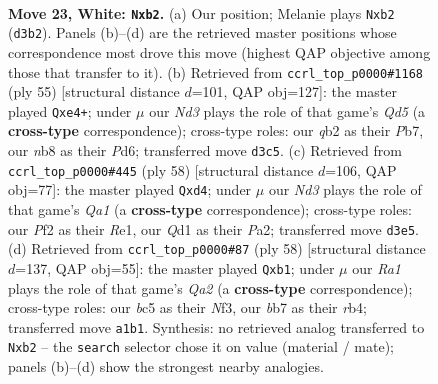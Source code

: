 \documentclass[11pt]{article}
\begin{document}
\clearpage

\begin{figure}[p]\centering
\begin{subfigure}{0.46\textwidth}\centering
\resizebox{\linewidth}{!}{%
\newchessgame
\chessboard[
  setfen={1n2k3/1b6/8/ppb2p2/8/3N2r1/Pq2PPB1/R2Q1RK1 w - - 2 23},
  showmover=false,
  pgfstyle=straightmove, color=movearrow, markmove={d3-b2}
]}
\caption{}
\end{subfigure}\hfill
\begin{subfigure}{0.46\textwidth}\centering
\resizebox{\linewidth}{!}{%
\newchessgame
\chessboard[
  setfen={1r3rk1/pp3pb1/3p2R1/2p4Q/2BqP3/8/P1P5/4K2R b - - 3 28},
  showmover=false,
  pgfstyle=straightmove, color=movearrow, markmove={d4-e4}
]}
\caption{}
\end{subfigure}
\\[4pt]
\begin{subfigure}{0.46\textwidth}\centering
\resizebox{\linewidth}{!}{%
\newchessgame
\chessboard[
  setfen={6k1/4n1p1/3p3p/1b1P4/1P1qN3/4bB2/P1r2RPP/Q3R1K1 w - - 9 30},
  showmover=false,
  pgfstyle=straightmove, color=movearrow, markmove={a1-d4}
]}
\caption{}
\end{subfigure}\hfill
\begin{subfigure}{0.46\textwidth}\centering
\resizebox{\linewidth}{!}{%
\newchessgame
\chessboard[
  setfen={7k/b4pp1/4b2p/3NP3/1r2P1P1/5N1P/Q1R3K1/1q6 w - - 6 30},
  showmover=false,
  pgfstyle=straightmove, color=movearrow, markmove={a2-b1}
]}
\caption{}
\end{subfigure}
\caption{\textbf{Move 23, White: \texttt{Nxb2}.} (a) Our position; Melanie plays \texttt{Nxb2} (\texttt{d3b2}). Panels (b)--(d) are the retrieved master positions whose correspondence most drove this move (highest QAP objective among those that transfer to it). (b) Retrieved from \texttt{ccrl\_top\_p0000\#1168} (ply 55) [structural distance $d$=101, QAP obj=127]: the master played \texttt{Qxe4+}; under $\mu$ our \emph{Nd3} plays the role of that game's \emph{Qd5} (a \textbf{cross-type} correspondence); cross-type roles: our \emph{q}b2 as their \emph{P}b7, our \emph{n}b8 as their \emph{P}d6; transferred move \texttt{d3c5}. (c) Retrieved from \texttt{ccrl\_top\_p0000\#445} (ply 58) [structural distance $d$=106, QAP obj=77]: the master played \texttt{Qxd4}; under $\mu$ our \emph{Nd3} plays the role of that game's \emph{Qa1} (a \textbf{cross-type} correspondence); cross-type roles: our \emph{P}f2 as their \emph{R}e1, our \emph{Q}d1 as their \emph{P}a2; transferred move \texttt{d3e5}. (d) Retrieved from \texttt{ccrl\_top\_p0000\#87} (ply 58) [structural distance $d$=137, QAP obj=55]: the master played \texttt{Qxb1}; under $\mu$ our \emph{Ra1} plays the role of that game's \emph{Qa2} (a \textbf{cross-type} correspondence); cross-type roles: our \emph{b}c5 as their \emph{N}f3, our \emph{b}b7 as their \emph{r}b4; transferred move \texttt{a1b1}. Synthesis: no retrieved analog transferred to \texttt{Nxb2} -- the \texttt{search} selector chose it on value (material / mate); panels (b)--(d) show the strongest nearby analogies.}
\label{fig:thought-m44}
\end{figure}
\end{document}
